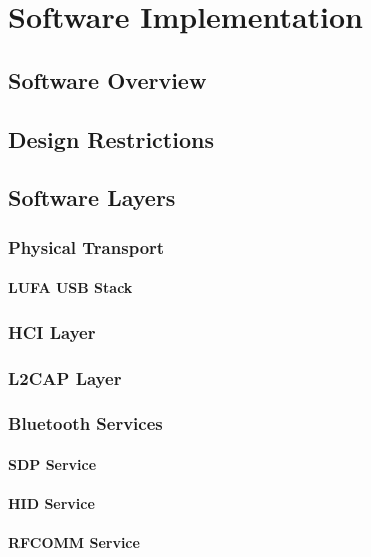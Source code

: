 \chapter{Software Implementation}
\label{Chapter 3}


\section{Software Overview}


\section{Design Restrictions}


\section{Software Layers}


\subsection{Physical Transport}


\subsubsection{LUFA USB Stack}


\subsection{HCI Layer}


\subsection{L2CAP Layer}


\subsection{Bluetooth Services}


\subsubsection{SDP Service}


\subsubsection{HID Service}


\subsubsection{RFCOMM Service}

